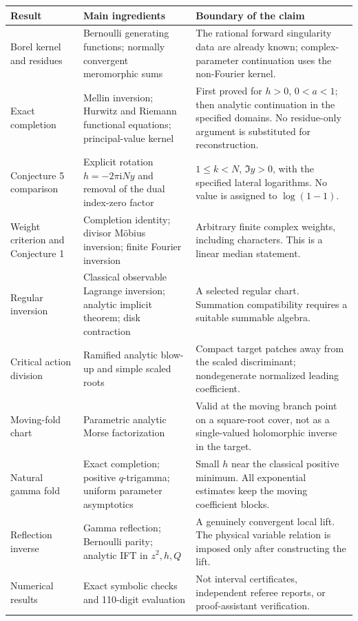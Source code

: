 \documentclass[11pt,a4paper]{article}
\numberwithin{equation}{section}
\theoremstyle{definition}
\theoremstyle{remark}\newtheorem{remark}[theorem]{Remark}
\newcommand{\ii}{\mathrm i}\newcommand{\e}{\mathrm e}
\begin{document}
\begingroup\small
\begin{longtable}{@{}P{.24\textwidth}P{.34\textwidth}P{.36\textwidth}@{}}
\toprule
Result & Main ingredients & Boundary of the claim\\
\midrule
\endhead
Borel kernel and residues & Bernoulli generating functions; normally
convergent meromorphic sums & The rational forward singularity data are
already known; complex-parameter continuation uses the non-Fourier
kernel.\\[5pt]
Exact completion & Mellin inversion; Hurwitz and Riemann functional
equations; principal-value kernel & First proved for $h>0$, $0<a<1$;
then analytic continuation in the specified domains. No residue-only
argument is substituted for reconstruction.\\[5pt]
Conjecture 5 comparison & Explicit rotation $h=-2\pi\ii Ny$ and removal
of the dual index-zero factor & $1\le k<N$, $\Im y>0$, with the specified
lateral logarithms. No value is assigned to $\log(1-1)$.\\[5pt]
Weight criterion and Conjecture 1 & Completion identity; divisor
M\"obius inversion; finite Fourier inversion & Arbitrary finite complex
weights, including characters. This is a linear median statement.\\[5pt]
Regular inversion & Classical observable Lagrange inversion; analytic
implicit theorem; disk contraction & A selected regular chart. Summation
compatibility requires a suitable summable algebra.\\[5pt]
Critical action division & Ramified analytic blow-up and simple scaled
roots & Compact target patches away from the scaled discriminant;
nondegenerate normalized leading coefficient.\\[5pt]
Moving-fold chart & Parametric analytic Morse factorization & Valid at
the moving branch point on a square-root cover, not as a single-valued
holomorphic inverse in the target.\\[5pt]
Natural gamma fold & Exact completion; positive $q$-trigamma; uniform
parameter asymptotics & Small $h$ near the classical positive minimum.
All exponential estimates keep the moving coefficient blocks.\\[5pt]
Reflection inverse & Gamma reflection; Bernoulli parity; analytic IFT
in $z^2,h,Q$ & A genuinely convergent local lift. The physical variable
relation is imposed only after constructing the lift.\\[5pt]
Numerical results & Exact symbolic checks and 110-digit evaluation &
Not interval certificates, independent referee reports, or
proof-assistant verification.\\
\bottomrule
\end{longtable}
\endgroup
\end{document}
